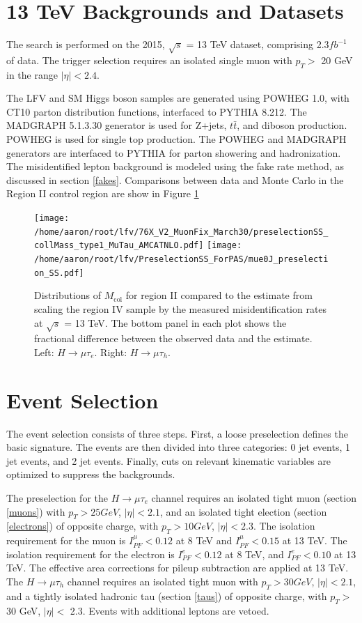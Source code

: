 \documentclass[oneside, letterpaper, oldfontcommands]{memoir}
\begin{document}
\section{13 TeV Backgrounds and Datasets}

\qquad The search is performed on the 2015, $\sqrt{s}$ = 13 TeV dataset, comprising 2.3$fb^{-1}$ of data. The trigger selection requires an isolated single muon with $p_{T} >$ 20 GeV in the range $|\eta| < 2.4$.

\qquad The LFV and SM Higgs boson samples are generated using POWHEG 1.0, with CT10 parton distribution functions, interfaced to PYTHIA 8.212. The MADGRAPH 5.1.3.30 generator is used for Z+jets, $t\bar{t}$, and diboson production. POWHEG is used for single top production. The POWHEG and MADGRAPH generators are interfaced to PYTHIA for parton showering and hadronization. The misidentified lepton background is modeled using the fake rate method, as discussed in section \ref{fakes}. Comparisons between data and Monte Carlo in the Region II control region are show in Figure \ref{fig:samesign_fakes13TeV} 

\begin{figure}[hbtp]\centering
\texttt{[image: /home/aaron/root/lfv/76X\_V2\_MuonFix\_March30/preselectionSS\_collMass\_type1\_MuTau\_AMCATNLO.pdf]}
\texttt{[image: /home/aaron/root/lfv/PreselectionSS\_ForPAS/mue0J\_preselection\_SS.pdf]}
\caption{Distributions of $M_\text{col}$ for region II compared to the estimate
from scaling the region IV sample by the measured misidentification rates at $\sqrt{s}$ = 13 TeV. The bottom panel in each plot shows the fractional difference between the observed data and the estimate. Left:  $H \rightarrow \mu \tau_{e}$. Right: $H \rightarrow \mu \tau_{h}$. }
\label{fig:samesign_fakes13TeV}\end{figure}
  
\section{Event Selection}\label{eventsel}
\qquad The event selection consists of three steps. First, a loose preselection defines the basic signature. The events are then divided into three categories: 0 jet events, 1 jet events, and 2 jet events. Finally, cuts on relevant kinematic variables are optimized to suppress the backgrounds. 

\qquad The preselection for the $H \rightarrow \mu\tau_{e}$ channel requires an isolated tight muon (section \ref{muons}) with $p_{T} > 25 GeV$, $|\eta| < 2.1$, and an isolated tight election (section \ref{electrons}) of opposite charge, with $p_{T} > 10 GeV$, $|\eta| < 2.3$. The isolation requirement for the muon is $I_{PF}^{\mu} < 0.12$ at 8 TeV and $I_{PF}^{\mu} < 0.15$ at 13 TeV. The isolation requirement for the electron is $I_{PF}^{e} < 0.12$ at 8 TeV, and $I_{PF}^{e} < 0.10$ at 13 TeV. The effective area corrections for pileup subtraction are applied at 13 TeV. The $H \rightarrow \mu\tau_{h}$ channel requires an isolated tight muon with $p_{T} > 30 GeV$, $|\eta| < 2.1$, and a tightly isolated hadronic tau (section \ref{taus}) of opposite charge, with $p_{T} >$ 30 GeV, $|\eta| <$ 2.3. Events with additional leptons are vetoed.
\end{document}
